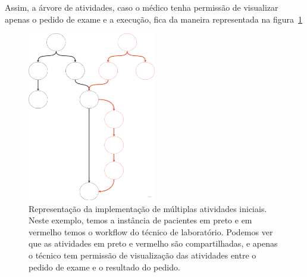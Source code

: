 Assim, a árvore de atividades, caso o médico tenha permissão de visualizar apenas o pedido de exame e a execução, fica da maneira representada na figura~\ref{fig:segunda_implementacao}

\begin{figure}
    \centering
    \includegraphics[width=0.5\textwidth]{imgs/Implementacoes/segundaImplementacao.png}
    \caption{Representação da implementação de múltiplas atividades iniciais. Neste exemplo, temos a instância de pacientes em preto e em vermelho temos o workflow do técnico de laboratório. Podemos ver que as atividades em preto e vermelho são compartilhadas, e apenas o técnico tem permissão de visualização das atividades entre o pedido de exame e o resultado do pedido.}
    \label{fig:segunda_implementacao}
\end{figure}

